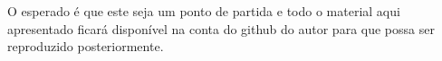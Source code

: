 \documentclass[
  12pt,				%
  openright,			%
  twoside,			%
  a4paper,			%
  english,			%
  french,				%
  spanish,			%
  brazil,				%
  ]{abntex2}
\begin{document}
O esperado é que este seja um ponto de partida e todo o material aqui apresentado ficará disponível na conta do github do autor para que possa ser reproduzido posteriormente.


\postextual



%
%









\end{document}
